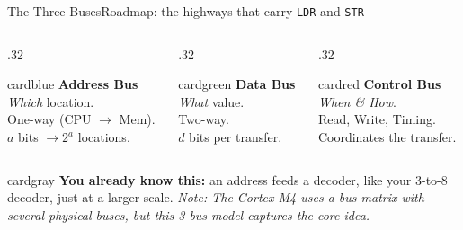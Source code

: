 \documentclass[9pt,aspectratio=169,xcolor=table]{beamer}
\begin{document}
\begin{frame}{The Three Buses}{Roadmap: the highways that carry \texttt{LDR} and \texttt{STR}}
\begin{center}
{}
    \end{center}

    \vspace{1mm}
    \begin{columns}[T]
		\begin{column}{.32\textwidth}
			\begin{beamercolorbox}[wd=\textwidth, center, rounded=true]{cardblue}
				\textbf{\textcolor{blue!80!black}{Address Bus}} \\
				\scriptsize\emph{Which} location. \\
				One-way (CPU $\to$ Mem). \\
				$a$ bits $\to 2^a$ locations.
			\end{beamercolorbox}
		\end{column}
		\begin{column}{.32\textwidth}
			\begin{beamercolorbox}[wd=\textwidth, center, rounded=true]{cardgreen}
				\textbf{\textcolor{green!60!black}{Data Bus}} \\
				\scriptsize\emph{What} value. \\
				Two-way. \\
				$d$ bits per transfer.
			\end{beamercolorbox}
		\end{column}
		\begin{column}{.32\textwidth}
			\begin{beamercolorbox}[wd=\textwidth, center, rounded=true]{cardred}
				\textbf{\textcolor{red!70!black}{Control Bus}} \\
				\scriptsize\emph{When \& How}. \\
				Read, Write, Timing. \\
				Coordinates the transfer.
			\end{beamercolorbox}
		\end{column}
	\end{columns}

	\vspace{2mm}
	\begin{beamercolorbox}[wd=\textwidth, center, rounded=true]{cardgray}
		\footnotesize \textbf{You already know this:} an address feeds a \alert{decoder}, like your 3-to-8 decoder, just at a larger scale. \emph{Note: The Cortex-M4 uses a bus matrix with several physical buses, but this 3-bus model captures the core idea.}
	\end{beamercolorbox}
\end{frame}
\end{document}
